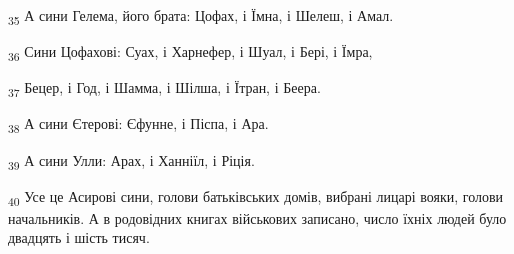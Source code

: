 \begin{tcolorbox}
\textsubscript{35} А сини Гелема, його брата: Цофах, і Їмна, і Шелеш, і Амал.
\end{tcolorbox}
\begin{tcolorbox}
\textsubscript{36} Сини Цофахові: Суах, і Харнефер, і Шуал, і Бері, і Їмра,
\end{tcolorbox}
\begin{tcolorbox}
\textsubscript{37} Бецер, і Год, і Шамма, і Шілша, і Їтран, і Беера.
\end{tcolorbox}
\begin{tcolorbox}
\textsubscript{38} А сини Єтерові: Єфунне, і Піспа, і Ара.
\end{tcolorbox}
\begin{tcolorbox}
\textsubscript{39} А сини Улли: Арах, і Ханніїл, і Ріція.
\end{tcolorbox}
\begin{tcolorbox}
\textsubscript{40} Усе це Асирові сини, голови батьківських домів, вибрані лицарі вояки, голови начальників. А в родовідних книгах військових записано, число їхніх людей було двадцять і шість тисяч.
\end{tcolorbox}
